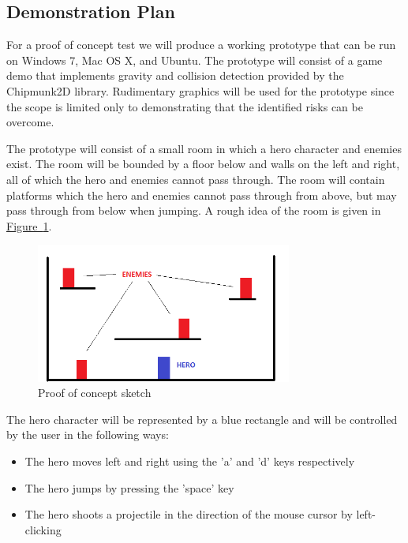 \documentclass[12pt, titlepage]{article}
\begin{document}
\subsection{Demonstration Plan}

For a proof of concept test we will produce a working prototype that can be run on Windows 7, Mac OS X, and Ubuntu.  The prototype will consist of a game demo that implements gravity and collision detection provided by the Chipmunk2D library.  Rudimentary graphics will be used for the prototype since the scope is limited only to demonstrating that the identified risks can be overcome.

The prototype will consist of a small room in which a hero character and enemies exist.  The room will be bounded by a floor below and walls on the left and right, all of which the hero and enemies cannot pass through.  The room will contain platforms which the hero and enemies cannot pass through from above, but may pass through from below when jumping.  A rough idea of the room is given in \hyperref[fig:room]{Figure~\ref*{fig:room}}.

\begin{figure}[ht]
\begin{center}
\includegraphics[width=0.75\textwidth]{demo}
\caption{Proof of concept sketch} \label{fig:room}
\end{center}
\end{figure}

The hero character will be represented by a blue rectangle and will be controlled by the user in the following ways:

\begin{itemize}
  \item The hero moves left and right using the 'a' and 'd' keys respectively
  \item The hero jumps by pressing the 'space' key
  \item The hero shoots a projectile in the direction of the mouse cursor by left-clicking
\end{itemize}
\end{document}
